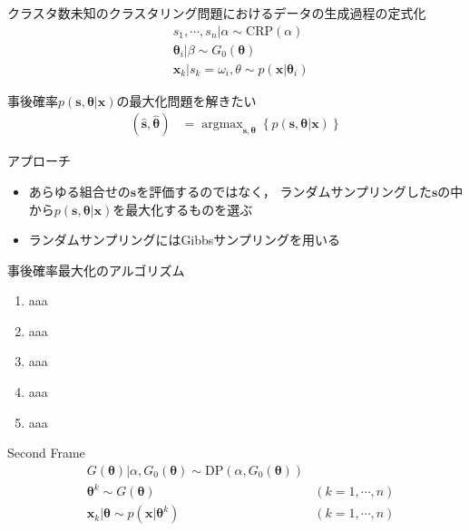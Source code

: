 \documentclass[10pt,fleqn]{beamer}
\DeclareMathOperator*{\argmax}{argmax}
\begin{document}
    \begin{frame}{クラスタ数未知のクラスタリング問題におけるデータの生成過程の定式化}
        \begin{align*}
            &s_1,\cdots,s_n | \alpha \sim \mathrm{CRP}(\alpha) \tag{12.4}\\
            &\bm\theta_i | \beta \sim G_0(\bm\theta) \tag{12.5}\\
            &\mathbf x_k | s_k = \omega_i,\theta \sim p(\mathbf x | \bm\theta_i) \tag{12.6} 
        \end{align*}
    \end{frame}
    
    \begin{frame}{事後確率$p(\mathbf s, \bm\theta | \mathbf x)$の最大化問題を解きたい}
        \begin{align*}
            (\hat{\mathbf s}, \hat{\bm\theta}) &= \argmax_{\mathbf s,\bm\theta}\left\{ p(\mathbf s, \bm\theta | \mathbf x) \right\} \tag{11.5}
        \end{align*}
        \begin{alertblock}{アプローチ}
            \begin{itemize}
                \item あらゆる組合せの$\mathbf s$を評価するのではなく，
                    ランダムサンプリングした$\mathbf s$の中から$p(\mathbf s, \bm\theta | \mathbf x)$を最大化するものを選ぶ
                \item ランダムサンプリングにはGibbsサンプリングを用いる
            \end{itemize}
        \end{alertblock}
    \end{frame}

	\begin{frame}{事後確率最大化のアルゴリズム}
		\begin{enumerate}
			\item aaa
			\item aaa
			\item aaa
			\item aaa
			\item aaa
		\end{enumerate}
	\end{frame}
    
    \begin{frame}{Second Frame}
        \begin{align}
            &G(\bm \theta) | \alpha, G_0(\bm \theta) \sim \mathrm{DP}(\alpha, G_0(\bm \theta)) \tag{12.1}\\
            &\bm \theta^k  \sim G(\bm \theta) & (k = 1,\cdots,n) \tag{12.2}\\
            &\mathbf x_k|\bm\theta \sim p(\mathbf x|\bm \theta^k) & (k = 1,\cdots,n) \tag{12.3}
        \end{align}
    \end{frame}
\end{document}

